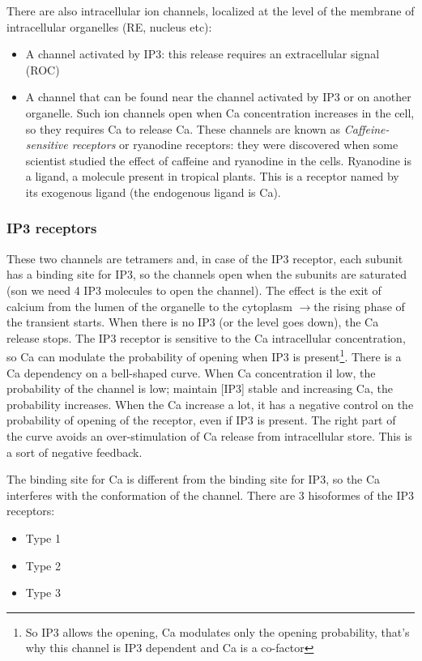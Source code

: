 \documentclass[a4paper, 12pt]{book}
\newcommand{\lfreccia}{\ensuremath{\longrightarrow}}
\begin{document}
There are also intracellular ion channels, localized at the level of the membrane of intracellular organelles (RE, nucleus etc):
\begin{itemize}
\item{A channel activated by IP3: this release requires an extracellular signal (ROC)}
\item{A channel that can be found near the channel activated by IP3 or on another organelle. Such ion channels open when Ca concentration increases in the cell, so they requires Ca to release Ca. These channels are known as \emph{Caffeine-sensitive receptors} or ryanodine receptors: they were discovered when some scientist studied the effect of caffeine and ryanodine in the cells. Ryanodine is a ligand, a molecule present in tropical plants. This is a receptor named by its exogenous ligand (the endogenous ligand is Ca).} 
\end{itemize}

\subsubsection{IP3 receptors}
These two channels are tetramers and, in case of the IP3 receptor, each subunit has a binding site for IP3, so the channels open when the subunits are saturated (son we need 4 IP3 molecules to open the channel). The effect is the exit of calcium from the lumen of the organelle to the cytoplasm \lfreccia the rising phase of the transient starts.
When there is no IP3 (or the level goes down), the Ca release stops. The IP3 receptor is sensitive to the Ca intracellular concentration, so Ca can modulate the probability of opening when IP3 is present\footnote{So IP3 allows the opening, Ca modulates only the opening probability, that's why this channel is IP3 dependent and Ca is a co-factor}.
There is a Ca dependency on a bell-shaped curve.  When Ca concentration il low, the probability of the channel is low; maintain [IP3] stable and increasing Ca, the probability increases. When the Ca increase a lot, it has a negative control on the probability of opening of the receptor, even if IP3 is present. The right part of the curve avoids an over-stimulation of Ca release from intracellular store. This is a sort of negative feedback. 
 
 The binding site for Ca is different from the binding site for IP3, so the Ca interferes with the conformation of the channel. There are 3 hisoformes of the IP3 receptors:
 \begin{itemize}
 \item{Type 1}
 \item{Type 2}
 \item{Type 3}
 \end{itemize}
 
\end{document}
